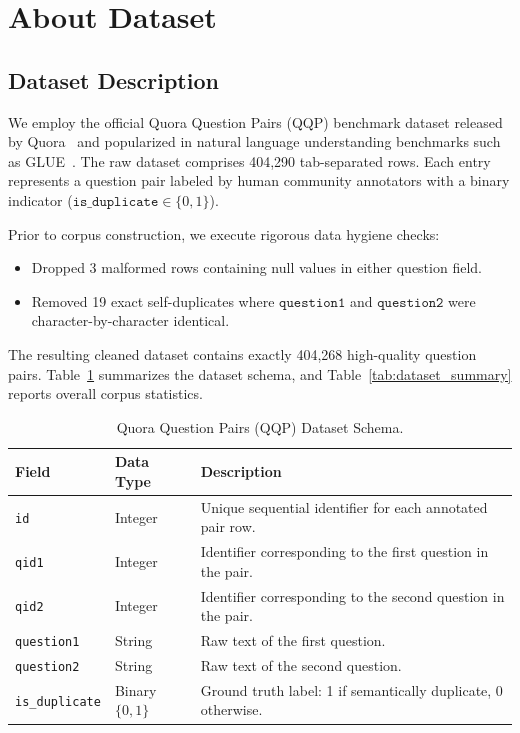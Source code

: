 \documentclass[11pt,a4paper]{article}
\begin{document}
\newpage

\section{About Dataset}
\label{sec:dataset}

\subsection{Dataset Description}
We employ the official Quora Question Pairs (QQP) benchmark dataset released by Quora~\cite{iyer2017quora} and popularized in natural language understanding benchmarks such as GLUE~\cite{wang2018glue}. The raw dataset comprises 404,290 tab-separated rows. Each entry represents a question pair labeled by human community annotators with a binary indicator ($\mathtt{is\_duplicate} \in \{0, 1\}$).

Prior to corpus construction, we execute rigorous data hygiene checks:
\begin{itemize}[noitemsep,topsep=0pt]
    \item Dropped 3 malformed rows containing null values in either question field.
    \item Removed 19 exact self-duplicates where $\mathtt{question1}$ and $\mathtt{question2}$ were character-by-character identical.
\end{itemize}
The resulting cleaned dataset contains exactly 404,268 high-quality question pairs. Table~\ref{tab:qqp_schema} summarizes the dataset schema, and Table~\ref{tab:dataset_summary} reports overall corpus statistics.

\begin{table}[h]
\centering
\small
\caption{Quora Question Pairs (QQP) Dataset Schema.}
\label{tab:qqp_schema}
\begin{tabularx}{\textwidth}{llX}
\toprule
\textbf{Field} & \textbf{Data Type} & \textbf{Description} \\
\midrule
\texttt{id} & Integer & Unique sequential identifier for each annotated pair row. \\
\texttt{qid1} & Integer & Identifier corresponding to the first question in the pair. \\
\texttt{qid2} & Integer & Identifier corresponding to the second question in the pair. \\
\texttt{question1} & String & Raw text of the first question. \\
\texttt{question2} & String & Raw text of the second question. \\
\texttt{is\_duplicate} & Binary $\{0, 1\}$ & Ground truth label: 1 if semantically duplicate, 0 otherwise. \\
\bottomrule
\end{tabularx}
\end{table}
\end{document}
